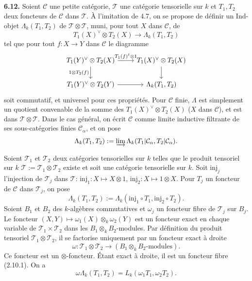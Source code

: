 \documentclass[12pt,a4paper]{article}
\theoremstyle{plain}
\theoremstyle{definition}
\theoremstyle{remark}
\begin{document}
\subsection{}

\textbf{6.12.} Soient $\mathcal{C}$ une petite catégorie, $\mathcal{T}$ une catégorie tensorielle sur $k$ et $T_1, T_2$ deux foncteurs de $\mathcal{C}$ dans $\mathcal{T}$. À l'imitation de 4.7, on se propose de définir un Ind-objet $\Lambda_k(T_1,T_2)$ de $\mathcal{T} \otimes \mathcal{T}$, muni, pour tout $X$ dans $\mathcal{C}$, de
\begin{equation}\label{eq:6.12.1}
T_1(X)^\vee \otimes T_2(X) \to \Lambda_k(T_1,T_2)
\end{equation}
tel que pour tout $f : X \to Y$ dans $\mathcal{C}$ le diagramme
\begin{equation}\label{eq:6.12.2}
\begin{tikzcd}
T_1(Y)^\vee \otimes T_2(X) \arrow[r, "T_1(f)^t \otimes 1"] \arrow[d, "1 \otimes T_2(f)"'] & T_1(X)^\vee \otimes T_2(X) \arrow[d] \\
T_1(Y)^\vee \otimes T_2(Y) \arrow[r] & \Lambda_k(T_1,T_2)
\end{tikzcd}
\end{equation}
soit commutatif, et universel pour ces propriétés. Pour $\mathcal{C}$ finie, $\Lambda$ est simplement un quotient convenable de la somme des $T_1(X)^\vee \otimes T_2(X)$ ($X$ dans $\mathcal{C}$), et est dans $\mathcal{T} \otimes \mathcal{T}$. Dans le cas général, on écrit $\mathcal{C}$ comme limite inductive filtrante de ses sous-catégories finies $\mathcal{C}_\alpha$, et on pose
\[
\Lambda_k(T_1,T_2) := \varinjlim \Lambda_k(T_1|\mathcal{C}_\alpha, T_2|\mathcal{C}_\alpha).
\]

Soient $\mathcal{T}_1$ et $\mathcal{T}_2$ deux catégories tensorielles sur $k$ telles que le produit tensoriel sur $k$ $\mathcal{T} := \mathcal{T}_1 \otimes \mathcal{T}_2$ existe et soit une catégorie tensorielle sur $k$. Soit $\mathrm{inj}_j$ l'injection de $\mathcal{T}_j$ dans $\mathcal{T}$: $\mathrm{inj}_1 : X \mapsto X \otimes 1$, $\mathrm{inj}_2 : X \mapsto 1 \otimes X$. Pour $T_j$ un foncteur de $\mathcal{C}$ dans $\mathcal{T}_j$, on pose
\[
\Lambda_k(T_1, T_2) := \Lambda_k(\mathrm{inj}_1 \circ T_1, \mathrm{inj}_2 \circ T_2).
\]
Soient $B_1$ et $B_2$ des $k$-algèbres commutatives et $\omega_j$ un foncteur fibre de $\mathcal{T}_j$ sur $B_j$. Le foncteur $(X,Y) \mapsto \omega_1(X) \otimes_k \omega_2(Y)$ est un foncteur exact en chaque variable de $\mathcal{T}_1 \times \mathcal{T}_2$ dans les $B_1 \otimes_k B_2$-modules. Par définition du produit tensoriel $\mathcal{T}_1 \otimes \mathcal{T}_2$, il se factorise uniquement par un foncteur exact à droite
\[
\omega : \mathcal{T}_1 \otimes \mathcal{T}_2 \to (B_1 \otimes_k B_2\text{-modules}).
\]
Ce foncteur est un $\otimes$-foncteur. Étant exact à droite, il est un foncteur fibre (2.10.1). On a
\begin{equation}\label{eq:6.12.3}
\omega \Lambda_k(T_1,T_2) = L_k(\omega_1 T_1, \omega_2 T_2).
\end{equation}
\end{document}
